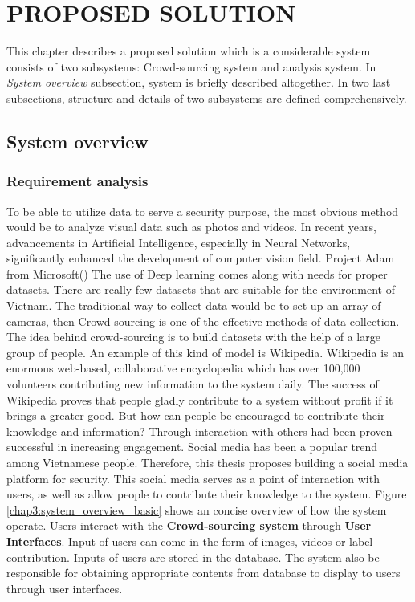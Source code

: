 \chapter{PROPOSED SOLUTION}
\label{chap:solution}

This chapter describes a proposed solution which is a considerable system consists of two subsystems: Crowd-sourcing system and  analysis system. In \textit{System overview} subsection, system is briefly described altogether. In two last subsections, structure and details of two subsystems are defined comprehensively.

\section{System overview}
\subsection{Requirement analysis}
To be able to utilize data to serve a security purpose, the most obvious method would be to analyze visual data such as photos and videos.  In recent years, advancements in Artificial Intelligence, especially in Neural Networks, significantly enhanced the development of computer vision field. Project Adam from Microsoft() The use of Deep learning comes along with needs for proper datasets. There are really few datasets that are suitable for the environment of Vietnam. 
The traditional way to collect data would be to set up an array of cameras, then
Crowd-sourcing is one of the effective methods of data collection. The idea behind crowd-sourcing is to build datasets with the help of a large group of people. An example of this kind of model is Wikipedia. Wikipedia is an enormous web-based, collaborative encyclopedia which has over 100,000 volunteers contributing new information to the system daily. The success of Wikipedia proves that people gladly contribute to a system without profit if it brings a greater good. 
But how can people be encouraged to contribute their knowledge and information? Through interaction with others had been proven successful in increasing engagement. Social media has been a popular trend among Vietnamese people. Therefore, this thesis proposes building a social media platform for security. This social media serves as a point of interaction with users, as well as allow people to contribute their knowledge to the system.
Figure \ref{chap3:system_overview_basic} shows an concise overview of how the system operate. Users interact with the \textbf{Crowd-sourcing system} through \textbf{User Interfaces}. Input of users can come in the form of images, videos or label contribution. Inputs of users are stored in the database. The system also be responsible for obtaining appropriate contents from database to display to users through user interfaces.
